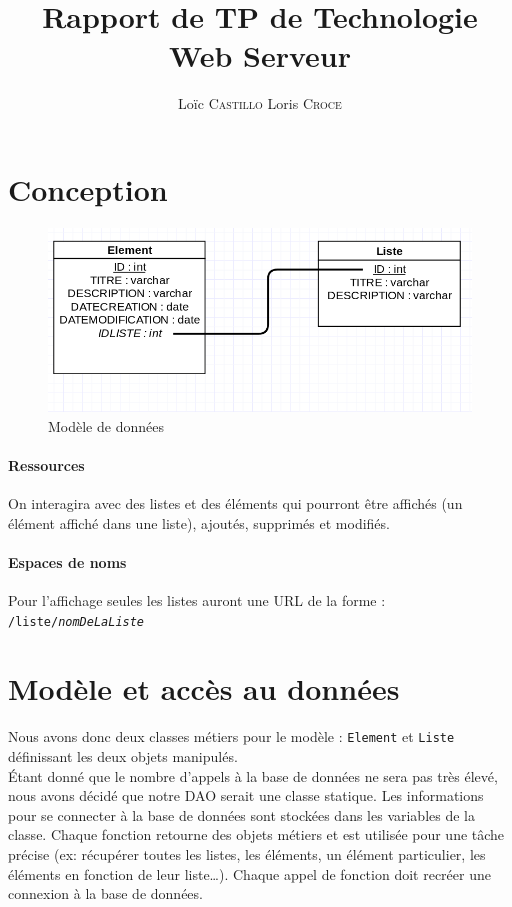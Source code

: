\documentclass[11pt, a4paper]{article}
\date{}
\title{Rapport de TP de Technologie Web Serveur}
\author{Loïc \textsc{Castillo} Loris \textsc{Croce}}
\begin{document}
\maketitle

\section{Conception}

\begin{figure}[!h]
   \includegraphics[width=15cm]{donnees.png}
   \caption{Modèle de données}
\end{figure}

\paragraph{Ressources} On interagira avec des listes et des éléments qui pourront être affichés (un élément affiché dans une liste), ajoutés, supprimés et modifiés.

\paragraph{Espaces de noms} Pour l'affichage seules les listes auront une URL de la forme : \texttt{/liste/\emph{nomDeLaListe}}




\section{Modèle et accès au données}

Nous avons donc deux classes métiers pour le modèle : \verb|Element| et \verb|Liste| définissant les deux objets manipulés.\\ 

Étant donné que le nombre d'appels à la base de données ne sera pas très élevé, nous avons décidé que notre DAO serait une classe statique. Les informations pour se connecter à la base de données sont stockées dans les variables de la classe. Chaque fonction retourne des objets métiers et est utilisée pour une tâche précise (ex: récupérer toutes les listes, les éléments, un élément particulier, les éléments en fonction de leur liste\dots). Chaque appel de fonction doit recréer une connexion à la base de données.
\end{document}
